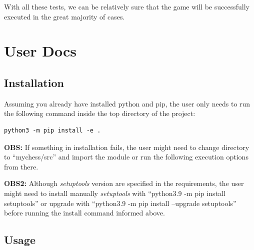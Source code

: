 \documentclass[10pt]{article}
\begin{document}
With all these tests, we can be relatively sure that the game will be successfully
executed in the great majority of cases.



\section{User Docs}

\subsection{Installation}

Assuming you already have installed python and pip, the user only needs to run
the following command inside the top directory of the project:
\begin{lstlisting}
python3 -m pip install -e .
\end{lstlisting}

\textbf{OBS:}
        If something in installation fails, the user might need to change directory to
        ``mychess/src'' and import the module or run the following execution options
        from there.

        \textbf{OBS2:} Although \textit{setuptools} version are specified in the requirements, the
        user might need to install manually \textit{setuptools} with ``python3.9 -m pip
        install setuptools'' or upgrade with ``python3.9 -m pip install
        --upgrade setuptools'' before running the install command
        informed above.


\subsection{Usage}
\end{document}
